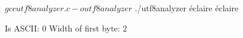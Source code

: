 \documentclass[12pt, oneside]{article}
\begin{document}


\begin{shell}[linewidth=40em]
$ gcc utf8analyzer.c -o utf8analyzer
$ ./utf8analyzer
éclaire
éclaire

Is ASCII: 0
Width of first byte: 2
\end{shell}


\newpage
\end{document}
